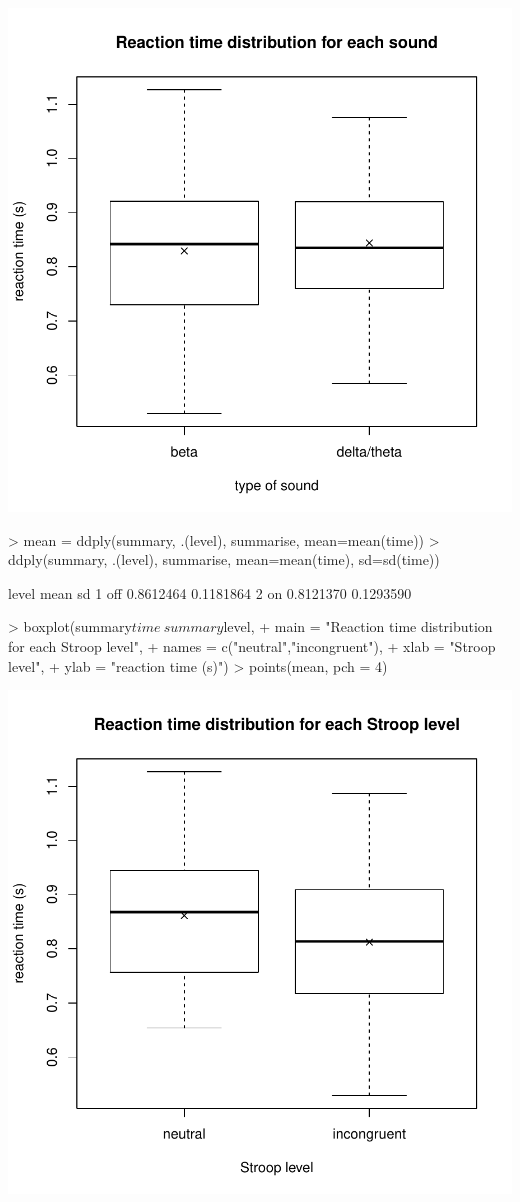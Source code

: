 \documentclass[12pt,a4paper]{article}
\begin{document}
\begin{itemize}
\includegraphics{report-010}
\begin{Schunk}
\begin{Sinput}
> mean = ddply(summary, .(level), summarise, mean=mean(time))
> ddply(summary, .(level), summarise, mean=mean(time), sd=sd(time))
\end{Sinput}
\begin{Soutput}
  level      mean        sd
1   off 0.8612464 0.1181864
2    on 0.8121370 0.1293590
\end{Soutput}
\begin{Sinput}
> boxplot(summary$time~summary$level,
+ main = "Reaction time distribution for each Stroop level",
+ names = c("neutral","incongruent"),
+ xlab = "Stroop level",
+ ylab = "reaction time (s)")
> points(mean, pch = 4)
\end{Sinput}
\end{Schunk}
\includegraphics{report-011}

\end{itemize}
\end{document}
